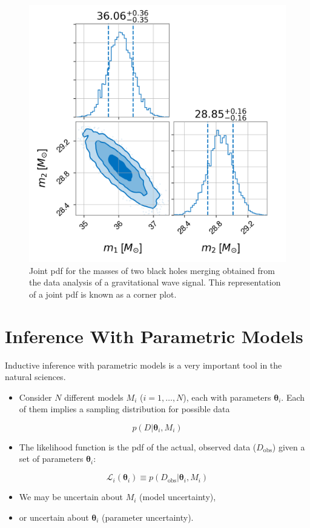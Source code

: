 \documentclass[%
oneside,                 %
final,                   %
10pt]{article}
\newenvironment{block_mdfboxadmon}[1][]{
\begin{block_mdfboxmdframed}[frametitle=#1]
}
{
\end{block_mdfboxmdframed}
}
\begin{document}
\begin{figure}[!ht]  %
  \centerline{\includegraphics[width=0.8\linewidth]{fig/m1m2.png}}
  \caption{
  Joint pdf for the masses of two black holes merging obtained from the data analysis of a gravitational wave signal. This representation of a joint pdf is known as a corner plot. \label{fig:gw}
  }
\end{figure}


\section{Inference With Parametric Models}

\begin{block_mdfboxadmon}[]
Inductive inference with parametric models is a very important tool in the natural sciences.
\begin{itemize}
\item Consider $N$ different models $M_i$ ($i = 1, \ldots, N$), each with parameters $\boldsymbol{\theta}_i$. Each of them implies a sampling distribution for possible data
\end{itemize}

\noindent
\[
p(D|\boldsymbol{\theta}_i, M_i)
\]

\begin{itemize}
\item The likelihood function is the pdf of the actual, observed data ($D_\mathrm{obs}$) given a set of parameters $\boldsymbol{\theta}_i$:
\end{itemize}

\noindent
\[
\mathcal{L}_i (\boldsymbol{\theta}_i) \equiv p(D_\mathrm{obs}|\boldsymbol{\theta}_i, M_i)
\]
\begin{itemize}
\item We may be uncertain about $M_i$ (model uncertainty),

\item or uncertain about $\boldsymbol{\theta}_i$ (parameter uncertainty).
\end{itemize}

\noindent
\end{block_mdfboxadmon} %
\end{document}
